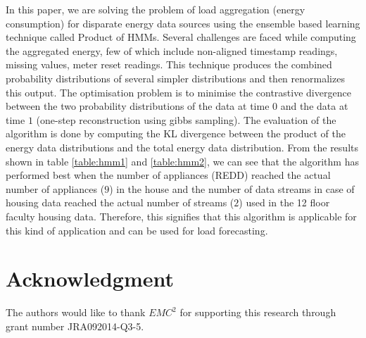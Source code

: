 \documentclass[runningheads,a4paper]{llncs}
\begin{document}
In this paper, we are solving the problem of load aggregation (energy consumption) for disparate energy data sources using the ensemble based learning technique called Product of HMMs. Several challenges are faced while computing the aggregated energy, few of which include non-aligned timestamp readings, missing values, meter reset readings. This technique produces the combined probability distributions of several simpler distributions and then renormalizes this output. The optimisation problem is to minimise the contrastive divergence between the two probability distributions of the data at time $0$ and the data at time $1$ (one-step reconstruction using gibbs sampling). The evaluation of the algorithm is done by computing the KL divergence between the product of the energy data distributions and the total energy data distribution. From the results shown in table \ref{table:hmm1} and \ref{table:hmm2}, we can see that the algorithm has performed best when the number of appliances (REDD) reached the actual number of appliances ($9$) in the house and the number of data streams in case of housing data reached the actual number of streams ($2$) used in the 12 floor faculty housing data. Therefore, this signifies that this algorithm is applicable for this kind of application and can be used for load forecasting.



\section*{Acknowledgment}
The authors would like to thank $EMC^2$ for supporting this research through grant number JRA092014-Q3-5.
%
%



\nocite{CarrieArmel2013213,eps272990,NIPS2010,Rabiner,SS97a,Kawamoto,Diane,Klopfert,Ghahramani,Felice,Shen,taban,Albert,wijaya2014consumer,Zhang,Daneshi,bassi,samuel,Falvo,Bakirtzis,Chen,Chow,DisaggregationHSMM,KolterJ12,KolterF11,BLTJ:BLTJ21650,Heinzelman00energy,Taylor,NYAS:NYAS5921,
Wijaya,5620917,1626400,mckerracher,hinton2000,aistats,fhmm,andrew}

\end{document}
